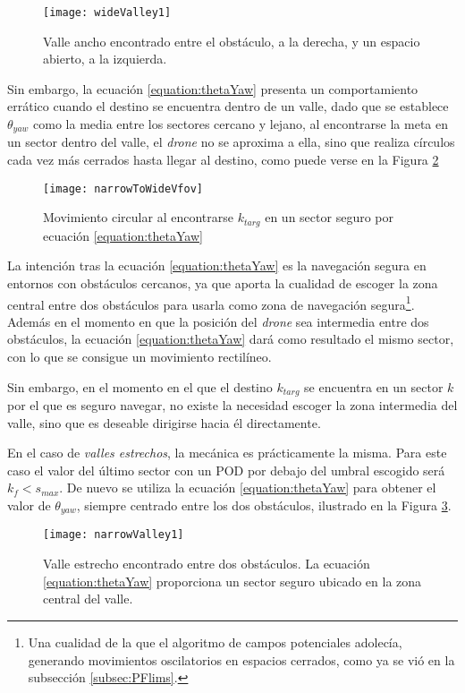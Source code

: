  \begin{figure}[H]
	\centering
	\texttt{[image: wideValley1]}
	\caption[Valles estrechos y anchos.]{Valle ancho encontrado entre el obstáculo, a la derecha, y un espacio abierto, a la izquierda.}\label{fig:wvalley1}
\end{figure}


Sin embargo, la ecuación \ref{equation:thetaYaw} presenta un comportamiento errático cuando el destino se encuentra dentro de un valle, dado que se establece $\theta_{yaw}$ como la media entre los sectores cercano y lejano, al encontrarse la meta en un sector dentro del valle, el \emph{drone} no se aproxima a ella, sino que realiza círculos cada vez más cerrados hasta llegar al destino, como puede verse en la Figura \ref{fig:nToWFOV}

 \begin{figure}[H]
	\centering
	\texttt{[image: narrowToWideVfov]}
	\caption[Movimiento circular del agente.]{Movimiento circular al encontrarse $k_{targ}$ en un sector seguro por ecuación \ref{equation:thetaYaw}}\label{fig:nToWFOV}
\end{figure}

La intención tras la ecuación \ref{equation:thetaYaw} es la navegación segura en entornos con obstáculos cercanos, ya que aporta la cualidad de escoger la zona central entre dos obstáculos para usarla como zona de navegación segura\footnote{Una cualidad de la que el algoritmo de campos potenciales adolecía, generando movimientos oscilatorios en espacios cerrados, como ya se vió en la subsección \ref{subsec:PFlims}.}. Además en el momento en que la posición del \emph{drone} sea intermedia entre dos obstáculos, la ecuación \ref{equation:thetaYaw} dará como resultado el mismo sector, con lo que se consigue un movimiento rectilíneo. 

Sin embargo, en el momento en el que el destino $k_\mathit{targ}$ se encuentra en un sector $k$ por el que es seguro navegar, no existe la necesidad escoger la zona intermedia del valle, sino que es deseable dirigirse hacia él directamente. 

En el caso de \textit{valles estrechos}, la mecánica es prácticamente la misma. Para este caso el valor del último sector con un POD por debajo del umbral escogido será $k_f < s_\mathit{max}$. De nuevo se utiliza la ecuación \ref{equation:thetaYaw} para obtener el valor de $\theta_\mathit{yaw}$, siempre centrado entre los dos obstáculos, ilustrado en la Figura \ref{fig:nvalley1}.
 \begin{figure}[H]
	\centering
	\texttt{[image: narrowValley1]}
	\caption[Valle estrecho.]{Valle estrecho encontrado entre dos obstáculos. La ecuación \ref{equation:thetaYaw} proporciona un sector seguro ubicado en la zona central del valle.}\label{fig:nvalley1}
\end{figure}

